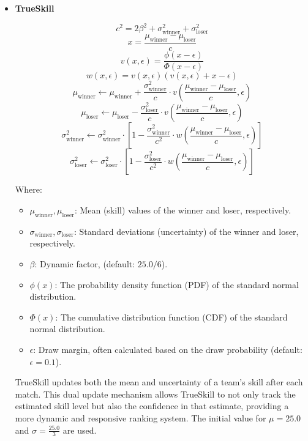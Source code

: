 \begin{itemize}
\item \textbf{TrueSkill}
\label{par:trueskill}

\[
c^2 = 2\beta^2 + \sigma_{\text{winner}}^2 + \sigma_{\text{loser}}^2
\]
\[
x = \frac{\mu_{\text{winner}} - \mu_{\text{loser}}}{c}
\]
\[
v(x, \epsilon) = \frac{\phi(x - \epsilon)}{\Phi(x - \epsilon)}
\]
\[
w(x, \epsilon) = v(x, \epsilon) \left( v(x, \epsilon) + x - \epsilon \right)
\]
\[
\mu_{\text{winner}} \leftarrow \mu_{\text{winner}} + \frac{\sigma_{\text{winner}}^2}{c} \cdot v\left(\frac{\mu_{\text{winner}} - \mu_{\text{loser}}}{c}, \epsilon \right)
\]
\[
\mu_{\text{loser}} \leftarrow \mu_{\text{loser}} - \frac{\sigma_{\text{loser}}^2}{c} \cdot v\left(\frac{\mu_{\text{winner}} - \mu_{\text{loser}}}{c}, \epsilon \right)
\]
\[
\sigma_{\text{winner}}^2 \leftarrow \sigma_{\text{winner}}^2 \cdot \left[ 1 - \frac{\sigma_{\text{winner}}^2}{c^2} \cdot w\left(\frac{\mu_{\text{winner}} - \mu_{\text{loser}}}{c}, \epsilon \right) \right]
\]
\[
\sigma_{\text{loser}}^2 \leftarrow \sigma_{\text{loser}}^2 \cdot \left[ 1 - \frac{\sigma_{\text{loser}}^2}{c^2} \cdot w\left(\frac{\mu_{\text{winner}} - \mu_{\text{loser}}}{c}, \epsilon \right) \right]
\]



Where:

\begin{itemize}
    \item \( \mu_{\text{winner}}, \mu_{\text{loser}} \): Mean (skill) values of the winner and loser, respectively.
    \item \( \sigma_{\text{winner}}, \sigma_{\text{loser}} \): Standard deviations (uncertainty) of the winner and loser, respectively.
    \item \( \beta \): Dynamic factor, (default: \( 25.0 / 6 \)).
    \item\( \phi(x) \): The probability density function (PDF) of the standard normal distribution.
    \item\( \Phi(x) \): The cumulative distribution function (CDF) of the standard normal distribution.
    \item \( \epsilon \): Draw margin, often calculated based on the draw probability (default: \( \epsilon = 0.1 \)).
\end{itemize}

TrueSkill updates both the mean and uncertainty of a team's skill after each match. This dual update mechanism allows TrueSkill to not only track the estimated skill level but also the confidence in that estimate, providing a more dynamic and responsive ranking system. The initial value for \(\mu = 25.0\) and \(\sigma = \frac{25.0}{3}\) are used.

\end{itemize}


